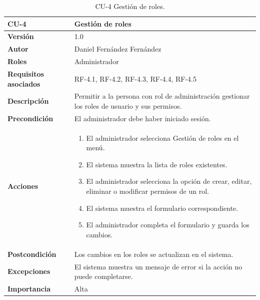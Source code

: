 \begin{table}[p]
        \centering
        \begin{tabularx}{\linewidth}{ p{} p{} }
            \toprule
            \textbf{CU-4} & \textbf{Gestión de roles}\\
            \toprule
            \textbf{Versión} & 1.0 \\
            \textbf{Autor} & Daniel Fernández Fernández \\
            \textbf{Roles} & Administrador \\
            \textbf{Requisitos asociados} & RF-4.1, RF-4.2, RF-4.3, RF-4.4, RF-4.5 \\
            \textbf{Descripción} & Permitir a la persona con rol de administración gestionar los roles de usuario y sus permisos. \\
            \textbf{Precondición} & El administrador debe haber iniciado sesión. \\
            \textbf{Acciones} &
            \begin{enumerate}
            \def\labelenumi{\arabic{enumi}.}
            \tightlist
            \item El administrador selecciona Gestión de roles en el menú.
            \item El sistema muestra la lista de roles existentes.
            \item El administrador selecciona la opción de crear, editar, eliminar o modificar permisos de un rol.
            \item El sistema muestra el formulario correspondiente.
            \item El administrador completa el formulario y guarda los cambios.
            \end{enumerate}\\
            \textbf{Postcondición} & Los cambios en los roles se actualizan en el sistema. \\
            \textbf{Excepciones} & El sistema muestra un mensaje de error si la acción no puede completarse. \\
            \textbf{Importancia} & Alta \\
            \bottomrule
        \end{tabularx}
        \caption{CU-4 Gestión de roles.}
\end{table}

